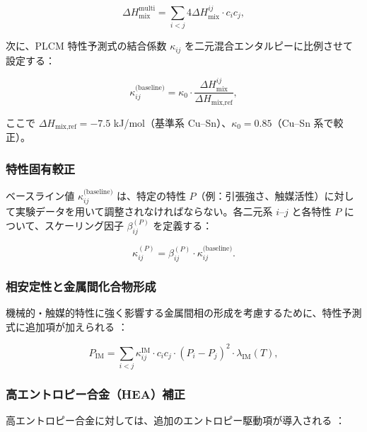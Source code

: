 \documentclass[11pt,a4paper]{article}
\theoremstyle{remark}
\begin{document}
	\begin{equation}
		\Delta H_{\text{mix}}^{\text{multi}} = \sum_{i<j} 4 \Delta H_{\text{mix}}^{ij} \cdot c_i c_j,
		\label{eq:multicomponent}
	\end{equation}
	
	次に、PLCM 特性予測式の結合係数 \(\kappa_{ij}\) を二元混合エンタルピーに比例させて設定する：
	
	\begin{equation}
		\kappa_{ij}^{\text{(baseline)}} = \kappa_0 \cdot \frac{\Delta H_{\text{mix}}^{ij}}{\Delta H_{\text{mix,ref}}},
		\label{eq:kappa-miedema}
	\end{equation}
	
	ここで \(\Delta H_{\text{mix,ref}} = -7.5\) kJ/mol（基準系 Cu–Sn）、\(\kappa_0 = 0.85\)（Cu–Sn 系で較正）。
	
	\subsubsection{特性固有較正}
	
	ベースライン値 \(\kappa_{ij}^{\text{(baseline)}}\) は、特定の特性 \(P\)（例：引張強さ、触媒活性）に対して実験データを用いて調整されなければならない。各二元系 \(i\)–\(j\) と各特性 \(P\) について、スケーリング因子 \(\beta_{ij}^{(P)}\) を定義する：
	
	\begin{equation}
		\kappa_{ij}^{(P)} = \beta_{ij}^{(P)} \cdot \kappa_{ij}^{\text{(baseline)}}.
		\label{eq:beta-calibration}
	\end{equation}
	
	\subsubsection{相安定性と金属間化合物形成}
	
	機械的・触媒的特性に強く影響する金属間相の形成を考慮するために、特性予測式に追加項が加えられる \cite{Wen2019}：
	
	\begin{equation}
		P_{\text{IM}} = \sum_{i<j} \kappa_{ij}^{\text{IM}} \cdot c_i c_j \cdot (P_i - P_j)^2 \cdot \lambda_{\text{IM}}(T),
		\label{eq:intermetallic}
	\end{equation}
	
	\subsubsection{高エントロピー合金（HEA）補正}
	
	高エントロピー合金に対しては、追加のエントロピー駆動項が導入される \cite{Wen2019, Yang2012}：
	
\end{document}
